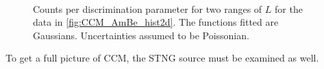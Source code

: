 \documentclass[11pt]{article}
\numberwithin{equation}{section}
\numberwithin{figure}{section}
\numberwithin{table}{section}
\begin{document}
\begin{figure}[h]%
    \centering
    \,
    \caption{Counts per discrimination parameter for two ranges of $L$ for the data in \cref{fig:CCM_AmBe_hist2d}. The functions fitted are Gaussians. Uncertainties assumed to be Poissonian.}
    \label{fig:CCM_AmBe_separation_hist_split}
\end{figure}
\par To get a full picture of CCM, the STNG source must be examined as well. 
\end{document}
